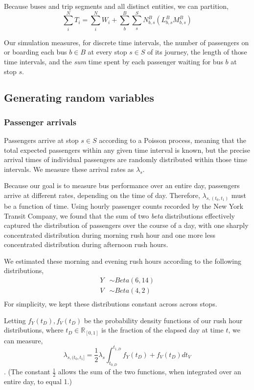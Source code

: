 \documentclass[12pt]{article}
\begin{document}
Because buses and trip segments and all distinct entities, we can partition,
\[
    \sum_i^N T_i = \sum_i^N W_i + \sum_b^B \sum_s^S N^B_{b,s} \left(L^B_{b,s}
        M^B_{b,s}\right)
\]

Our simulation measures, for discrete time intervals, the number of passengers
on or boarding each bus $b \in B$ at every stop $s \in S$ of its journey, the
length of those time intervals, and the \emph{sum} time spent by each
passenger waiting for bus $b$ at stop $s$.

\subsection{Generating random variables}

\subsubsection{Passenger arrivals}

Passengers arrive at stop $s \in S$ according to a Poisson process, meaning
that the total expected passengers within any given time interval is known,
but the precise arrival times of individual passengers are randomly
distributed within those time intervals. We measure these arrival rates as
$\lambda_s$.

Because our goal is to measure bus performance over an entire day, passengers
arrive at different rates, depending on the time of day. Therefore,
$\lambda_{s,(t_0,t_1)}$ must be a function of time. Using hourly passenger
counts recorded by the New York Transit Company, we found that the sum of two
\emph{beta} distributions effectively captured the distribution of passengers
over the course of a day, with one sharply concentrated distribution during
morning rush hour and one more less concentrated distribution during afternoon
rush hours.

We estimated these morning and evening rush hours according to the following
distributions,
\begin{align*}
    Y &\sim Beta(6, 14)\\
    V &\sim Beta(4, 2)\\
\end{align*}
For simplicity, we kept these distributions constant across across stops.

Letting $f_Y(t_D), f_V(t_D)$ be the probability density functions of our rush hour
distributions, where $t_D \in \mathbb R_{[0, 1]}$ is the fraction of the
elapsed day at time $t$, we can measure,
\[
    \lambda_{s,(t_0, t_1]} = \frac{1}{2}\lambda_s\int_{t_{0,D}}^{t_{1,D}} f_Y(t_D) +
    f_V(t_D) dt_V
\].
(The constant $\frac{1}{2}$ allows the sum of the two functions, when
integrated over an entire day, to equal 1.)
\end{document}
